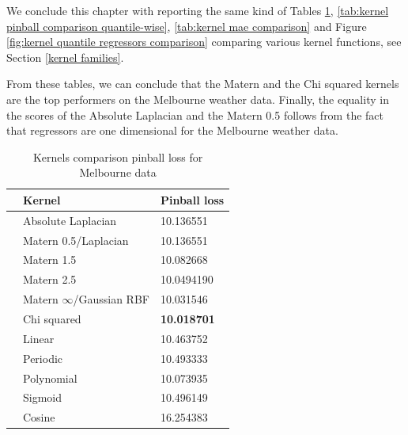 We conclude this chapter with reporting the same kind of Tables \ref{tab:kernel pinball comparison}, \ref{tab:kernel pinball comparison quantile-wise}, \ref{tab:kernel mae comparison} and Figure \ref{fig:kernel quantile regressors comparison} comparing various kernel functions, see Section \ref{kernel families}.

From these tables, we can conclude that the Matern and the Chi squared kernels are the top performers on the Melbourne weather data. Finally, the equality in the scores of the Absolute Laplacian and the Matern 0.5 follows from the fact that regressors are one dimensional for the Melbourne weather data.
\begin{table}[!h]
    \caption{Kernels comparison pinball loss for Melbourne data}
    \label{tab:kernel pinball comparison}
    \begin{center}
    \begin{tabular}{lll}
        \toprule
        & Kernel & Pinball loss
        \\
        \midrule
        & Absolute Laplacian &  10.136551 \\
        & Matern 0.5/Laplacian & 10.136551  \\
        & Matern 1.5 & 10.082668  \\
        & Matern 2.5 & 10.0494190    \\

        & Matern $\infty$/Gaussian RBF &  10.031546 \\

        & Chi squared & \textbf{10.018701}       \\
        
        & Linear & 10.463752    \\
        & Periodic  & 10.493333\\
        & Polynomial & 10.073935     \\
        & Sigmoid & 10.496149            \\
        & Cosine & 16.254383    \\
        \bottomrule
        \end{tabular}
    \end{center}
    \end{table}
    
